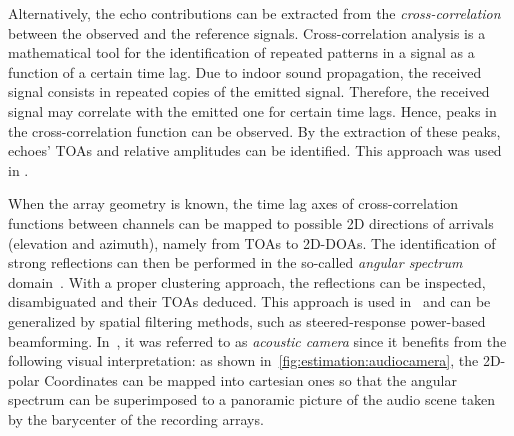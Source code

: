 \mynewline
Alternatively, the echo contributions can be extracted from the \textit{cross-correlation} between the observed and the reference signals.
Cross-correlation analysis is a mathematical tool for the identification of repeated patterns in a signal as a function of a certain time lag.
Due to indoor sound propagation, the received signal consists in repeated copies of the emitted signal.
Therefore, the received signal may correlate with the emitted one for certain time lags.
Hence, peaks in the cross-correlation function can be observed.
By the extraction of these peaks, echoes' \acp{TOA} and relative amplitudes can be identified.
This approach was used in .

When the array geometry is known, the time lag axes of cross-correlation functions between channels can be mapped to possible 2D directions of arrivals (elevation and azimuth), namely from \acp{TOA} to 2D-\acp{DOA}.
The identification of strong reflections can then be performed in the so-called \textit{angular spectrum} domain~.
With a proper clustering approach, the reflections can be inspected, disambiguated and their \acp{TOA} deduced.
This approach is used in~ and can be generalized by spatial filtering methods, such as steered-response power-based beamforming.
In~, it was referred to as \textit{acoustic camera} since it benefits from the following visual interpretation:
as shown in~\cref{fig:estimation:audiocamera}, the 2D-polar Coordinates can be mapped into cartesian ones so that the angular spectrum can be superimposed to a panoramic picture of the audio scene taken by the barycenter of the recording arrays.

